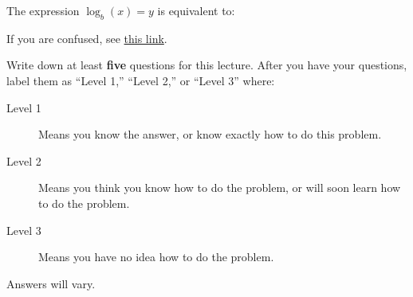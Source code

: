 \documentclass{ximera}
\begin{document}
\begin{question}
  The expression $\log_b(x) = y$ is equivalent to:
  \begin{hint}
    If you are confused, see \href{http://en.wikipedia.org/wiki/Logarithm}{this link}.
  \end{hint}
  \begin{multipleChoice}
  \end{multipleChoice}  
\end{question}

\begin{question}
Write down at least \textbf{five} questions for this lecture. After
you have your questions, label them as ``Level 1,'' ``Level 2,'' or ``Level 3'' where:
\begin{description}
\item[Level 1] Means you know the answer, or know exactly how to do this problem.
\item[Level 2] Means you think you know how to do the problem, or will soon learn how to do the problem.
\item[Level 3] Means you have no idea how to do the problem. 
\end{description}
\begin{freeResponse}
  Answers will vary.
\end{freeResponse}
\end{question}
\end{document}
